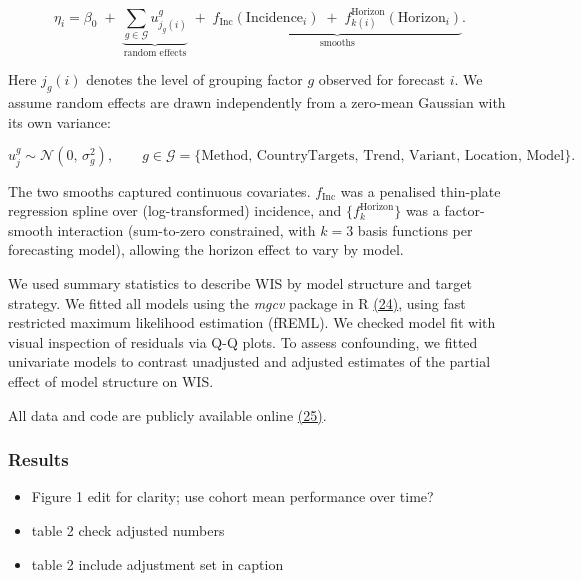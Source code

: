 \documentclass[
  letterpaper,
  DIV=11,
  numbers=noendperiod]{scrartcl}
\providecommand{\tightlist}{%
  \setlength{\itemsep}{0pt}\setlength{\parskip}{0pt}}
\begin{document}
\[
\eta_i = \beta_0 \;+\; \underbrace{\sum_{g \in \mathcal{G}} u^{g}_{j_g(i)}}_{\text{random effects}} \;+\; \underbrace{f_{\text{Inc}}(\mathrm{Incidence}_i) \;+\; f^{\text{Horizon}}_{k(i)}(\mathrm{Horizon}_i)}_{\text{smooths}}.
\]

Here \(j_g(i)\) denotes the level of grouping factor \(g\) observed for
forecast \(i\). We assume random effects are drawn independently from a
zero-mean Gaussian with its own variance:

\[
u^{g}_{j} \sim \mathcal{N}(0,\, \sigma^2_g), \qquad g \in \mathcal{G} = \{\text{Method},\, \text{CountryTargets},\, \text{Trend},\, \text{Variant},\, \text{Location},\, \text{Model}\}.
\]

The two smooths captured continuous covariates. \(f_{\text{Inc}}\) was a
penalised thin-plate regression spline over (log-transformed) incidence,
and \(\{f^{\text{Horizon}}_k\}\) was a factor-smooth interaction
(sum-to-zero constrained, with \(k=3\) basis functions per forecasting
model), allowing the horizon effect to vary by model.

We used summary statistics to describe WIS by model structure and target
strategy. We fitted all models using the \emph{mgcv} package in R
\href{https://www.zotero.org/google-docs/?Jv7oFh}{(24)}, using fast
restricted maximum likelihood estimation (fREML). We checked model fit
with visual inspection of residuals via Q-Q plots. To assess
confounding, we fitted univariate models to contrast unadjusted and
adjusted estimates of the partial effect of model structure on WIS.

All data and code are publicly available online
\href{https://www.zotero.org/google-docs/?qHy24c}{(25)}.

\subsubsection{Results}\label{results}

\begin{tcolorbox}[enhanced jigsaw, title=\textcolor{quarto-callout-caution-color}{\faFire}\hspace{0.5em}{TODO}, coltitle=black, colback=white, left=2mm, colbacktitle=quarto-callout-caution-color!10!white, breakable, bottomrule=.15mm, titlerule=0mm, opacityback=0, toprule=.15mm, rightrule=.15mm, arc=.35mm, toptitle=1mm, leftrule=.75mm, bottomtitle=1mm, opacitybacktitle=0.6, colframe=quarto-callout-caution-color-frame]

\begin{itemize}
\tightlist
\item[$\square$]
  Figure 1 edit for clarity; use cohort mean performance over time?
\item[$\square$]
  table 2 check adjusted numbers
\item[$\square$]
  table 2 include adjustment set in caption
\end{itemize}

\end{tcolorbox}
\end{document}
